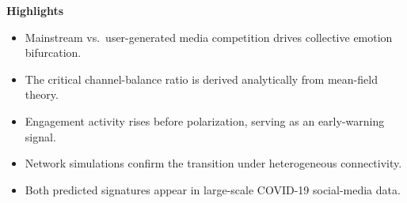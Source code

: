 \documentclass[11pt]{article}
\begin{document}
\noindent\textbf{\Large Highlights}

\vspace{1.5em}


\begin{itemize}
  \item Mainstream vs.\ user-generated media competition drives collective emotion bifurcation.
  \item The critical channel-balance ratio is derived analytically from mean-field theory.
  \item Engagement activity rises before polarization, serving as an early-warning signal.
  \item Network simulations confirm the transition under heterogeneous connectivity.
  \item Both predicted signatures appear in large-scale COVID-19 social-media data.
\end{itemize}
\end{document}
